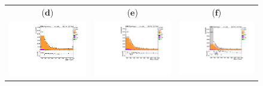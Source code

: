 \begin{figure}[htp]
\begin{tabular}{ccc}
   ($\mathbf{d}$)\qquad\qquad&($\mathbf{e}$)\qquad\qquad\qquad&($\mathbf{f}$)\qquad\qquad\qquad\\
\hspace{-0.5cm}
\includegraphics[scale=0.3]{fig/chapt6/qcd/qcd_e_ch/Mass_H_binned1.pdf}
& \hspace{-1.20cm} \includegraphics[scale=0.3]{fig/chapt6/qcd/qcd_e_ch/Mass_H_binned2.pdf}
& \hspace{-1.20cm} \includegraphics[scale=0.3]{fig/chapt6/qcd/qcd_e_ch/Mass_H_binned3.pdf}\\

\end{tabular}
\end{figure}
